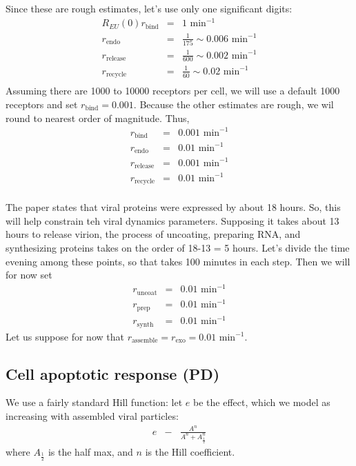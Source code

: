 \documentclass[12point]{article}
\begin{document}
Since these are rough estimates, let's use only one significant digits: 
\begin{eqnarray}
R_{EU}(0) r_\textrm{bind} & = & 1 \textrm{ min}^{-1} \\ 
r_\textrm{endo} & = & \frac{1}{175} \sim 0.006 \textrm{ min}^{-1} \\ 
r_\textrm{release} & = & \frac{1}{600} \sim 0.002 \textrm{ min}^{-1} \\ 
r_\textrm{recycle} & = & \frac{1}{60} \sim 0.02 \textrm{ min}^{-1} \\ 
\end{eqnarray}
Assuming there are 1000 to 10000 receptors per cell, we will use a default 1000 receptors and set $r_\textrm{bind} = 0.001 $. Because the other estimates are rough, we wil round to nearest order of magnitude. Thus, 
\begin{eqnarray}
r_\textrm{bind} & = & 0.001 \textrm{ min}^{-1} \\ 
r_\textrm{endo} & = & 0.01 \textrm{ min}^{-1} \\ 
r_\textrm{release} & = & 0.001 \textrm{ min}^{-1} \\ 
r_\textrm{recycle} & = & 0.01 \textrm{ min}^{-1} \\ 
\end{eqnarray}

The paper states that viral proteins were expressed by about 18 hours. So, this will help constrain teh viral dynamics parameters.  Supposing it takes about 13 hours to release virion, the process of uncoating, preparing RNA, and synthesizing proteins takes on the order of 18-13 = 5 hours. Let's divide the time evening among these points, so that takes 100 minutes in each step. Then we will for now set 
\begin{eqnarray}
r_\textrm{uncoat} & = & 0.01 \textrm{ min}^{-1} \\ 
r_\textrm{prep} & = & 0.01 \textrm{ min}^{-1} \\ 
r_\textrm{synth} & = & 0.01 \textrm{ min}^{-1} 
\end{eqnarray}
Let us suppose for now that $r_\textrm{assemble} = r_\textrm{exo} = 0.01 \textrm{ min}^{-1}$. 
 


\subsection{Cell apoptotic response (PD)}
We use a fairly standard Hill function: let $e$ be the effect, which we model as increasing with assembled viral particles: 
\begin{eqnarray}
e & - & \frac{ A^n  }{ A^n + A_{\frac{1}{2}}^n  }
\end{eqnarray}
where $A_{\frac{1}{2}}$ is the half max, and $n$ is the Hill coefficient. 
\end{document}
